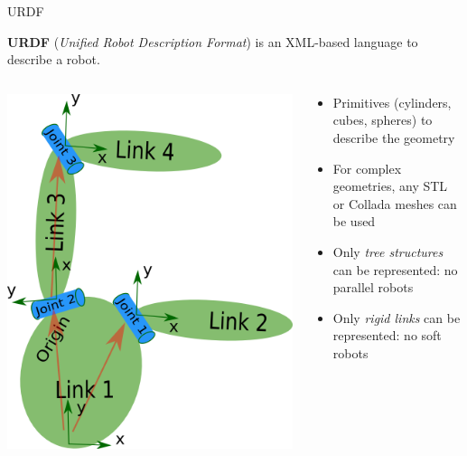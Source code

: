 \documentclass[compress]{beamer}
\begin{document}
\begin{frame}{URDF}

        \textbf{URDF} (\emph{Unified Robot Description Format}) is an XML-based language
        to describe a robot.

        \begin{columns}
            \begin{column}{0.5\linewidth}
        \begin{center}
            \includegraphics[width=0.8\linewidth]{link}
        \end{center}
                
            \end{column}
            \begin{column}{0.5\linewidth}
        \begin{itemize}
                \small
            \item Primitives (cylinders, cubes, spheres) to describe the
                geometry
            \item For complex geometries, any STL or Collada meshes can be used
            \item Only \emph{tree structures} can be represented: no parallel robots
            \item Only \emph{rigid links} can be represented: no soft robots
        \end{itemize}
            \end{column}
        \end{columns}
\end{frame}
\end{document}
